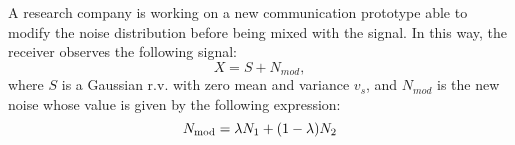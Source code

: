 
\begin{solution}
\end{solution}


\else
%
\question[25] 

A research company is working on a new communication prototype able to modify the noise distribution before being mixed with the signal. In this way, the receiver observes the following signal:
$$ X= S+N_{mod},$$
where $S$ is a Gaussian r.v. with zero mean and variance $v_s$, and  $N_{mod}$ is the new noise whose value is given by the following expression:
$$N_{\rm mod} = \lambda  N_1 + (1-\lambda) N_2$$

